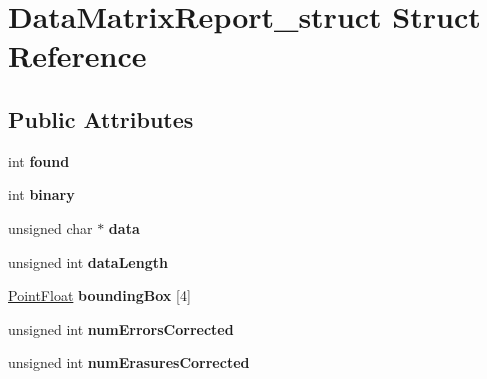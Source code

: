 \hypertarget{structDataMatrixReport__struct}{
\section{DataMatrixReport\_\-struct Struct Reference}
\label{structDataMatrixReport__struct}
}
\subsection*{Public Attributes}
\begin{DoxyCompactItemize}
\item 
\hypertarget{structDataMatrixReport__struct_a0f3fb2b4be8aa61b5fa0a94553479922}{
int {\bfseries found}}
\label{structDataMatrixReport__struct_a0f3fb2b4be8aa61b5fa0a94553479922}

\item 
\hypertarget{structDataMatrixReport__struct_a4156a3f979387a75a8d97cfa110216e4}{
int {\bfseries binary}}
\label{structDataMatrixReport__struct_a4156a3f979387a75a8d97cfa110216e4}

\item 
\hypertarget{structDataMatrixReport__struct_af0593dc4e0d9402aa8ef451e630249f9}{
unsigned char $\ast$ {\bfseries data}}
\label{structDataMatrixReport__struct_af0593dc4e0d9402aa8ef451e630249f9}

\item 
\hypertarget{structDataMatrixReport__struct_a5f1e53ddd180ff4eb3d512190bfdee25}{
unsigned int {\bfseries dataLength}}
\label{structDataMatrixReport__struct_a5f1e53ddd180ff4eb3d512190bfdee25}

\item 
\hypertarget{structDataMatrixReport__struct_acb65de27579e014fd4fe2328cefddaf5}{
\hyperlink{structPointFloat__struct}{PointFloat} {\bfseries boundingBox} \mbox{[}4\mbox{]}}
\label{structDataMatrixReport__struct_acb65de27579e014fd4fe2328cefddaf5}

\item 
\hypertarget{structDataMatrixReport__struct_a549194fecd0a9d70de05483eab8deeb2}{
unsigned int {\bfseries numErrorsCorrected}}
\label{structDataMatrixReport__struct_a549194fecd0a9d70de05483eab8deeb2}

\item 
\hypertarget{structDataMatrixReport__struct_ab7e26832de30994588ca2fb16d32418e}{
unsigned int {\bfseries numErasuresCorrected}}
\label{structDataMatrixReport__struct_ab7e26832de30994588ca2fb16d32418e}


\end{DoxyCompactItemize}
